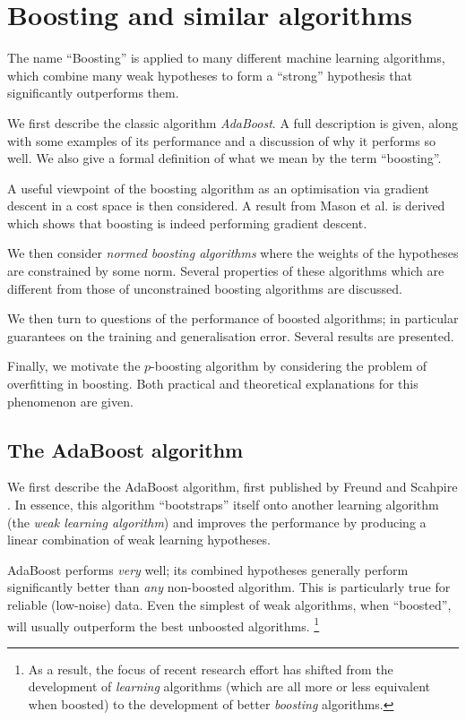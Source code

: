 

\chapter{Boosting and similar algorithms}
\label{chapter:boosting}

The name ``Boosting'' is applied to many different machine learning
algorithms, which combine many weak hypotheses to form a ``strong''
hypothesis that significantly outperforms them.

We first describe the classic algorithm \emph{AdaBoost}.  A full
description is given, along with some examples of its performance and
a discussion of why it performs so well.  We also give a formal
definition of what we mean by the term ``boosting''.

A useful viewpoint of the boosting algorithm as an optimisation via
gradient descent in a cost space is then considered.  A result from
Mason et al. \cite{Mason99} is derived which shows that boosting is
indeed performing gradient descent.

We then consider \emph{normed boosting algorithms} where the
weights of the hypotheses are constrained by some norm.  Several
properties of these algorithms which are different from those of
unconstrained boosting algorithms are discussed.

We then turn to questions of the performance of boosted algorithms; in
particular guarantees on the training and generalisation error.
Several results are presented.

Finally, we motivate the $p$-boosting algorithm by considering the
problem of overfitting in boosting.  Both practical and theoretical
explanations for this phenomenon are given.


\section{The AdaBoost algorithm}

We first describe the AdaBoost algorithm, first published by Freund
and Scahpire \cite{Freund96}.  In essence, this algorithm
``bootstraps'' itself onto another learning algorithm (the \emph{weak
learning algorithm}) and improves the performance by producing a
linear combination of weak learning hypotheses.

AdaBoost performs \emph{very} well; its combined hypotheses generally
perform significantly better than \emph{any} non-boosted algorithm.
This is particularly true for reliable (low-noise) data.  Even
the simplest of weak algorithms, when ``boosted'', will usually
outperform the best unboosted algorithms.
\footnote{As a result, the focus of recent research effort has shifted
from the development of \emph{learning} algorithms (which are all more 
or less equivalent when boosted) to the development of better
\emph{boosting} algorithms.}


